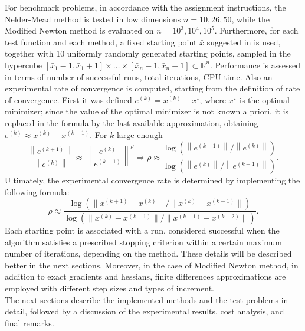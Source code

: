 \documentclass[a4paper,12pt]{article}
\begin{document}
	For benchmark problems, in accordance with the assignment instructions,  the Nelder-Mead method is tested in low dimensions \( n = 10, 26, 50 \), while the Modified Newton method is evaluated on \( n = 10^3, 10^4, 10^5 \). Furthermore, for each test function and each method, a fixed starting point $\bar{x}$ suggested in \cite{luksan1999} is used, together with 10 uniformly randomly generated starting points, sampled in the hypercube $[\bar{x}_{1}-1,\bar{x}_{1}+1]\times\dots\times[\bar{x}_{n}-1,\bar{x}_{n}+1] \subset \mathbb{R}^{n}$. Performance is assessed in terms of number of successful runs, total iterations, CPU time. Also an experimental rate of convergence is computed, starting from the definition of rate of convergence. First it was defined $e^{(k)} = x^{(k)} - x^{\star}$, where $x^{\star}$ is the optimal minimizer; since the value of the optimal minimizer is not known a priori, it is replaced in the formula by the last available approximation, obtaining $e^{(k)} \approx x^{(k)} - x^{(k-1)}$. For $k$ large enough
	\[
	\frac{\left\|e^{(k+1)}\right\|}{\left\|e^{(k)}\right\|} \approx \left\| \frac{e^{(k)}}{e^{(k-1)}} \right\|^{\rho} \Rightarrow \rho \approx \frac{\log\left(\left\|e^{(k+1)}\right\|\big/\left\|e^{(k)}\right\|\right)}{\log\left(\left\|e^{(k)}\right\|\big/\left\|e^{(k-1)}\right\|\right)}.
	\]
	Ultimately, the experimental convergence rate is determined by implementing the following formula:
	\[
	\rho \approx \frac{\log\left(\|x^{(k+1)} - x^{(k)}\|\big/\|x^{(k)} - x^{(k-1)}\|\right)}{\log\left(\|x^{(k)} - x^{(k-1)}\|\big/\|x^{(k-1)} - x^{(k-2)}\|\right)}.
	\]
		Each starting point is associated with a run, considered successful when the algorithm satisfies a prescribed stopping criterion within a certain maximum number of iterations, depending on the method. These details will be described better in the next sections. Moreover, in the case of Modified Newton method, in addition to exact gradients and hessians, finite differences approximations are employed with different step sizes and types of increment. \\
	
	The next sections describe the implemented methods and the test problems in detail, followed by a discussion of the experimental results, cost analysis, and final remarks.
		
	\vspace{1em}
	
	
	\vspace{1em}	
		
\end{document}
